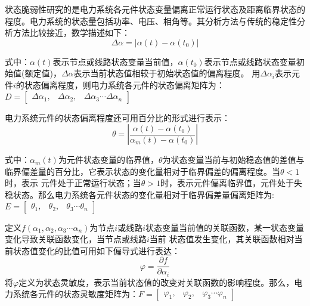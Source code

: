状态脆弱性研究的是电力系统各元件状态变量偏离正常运行状态及距离临界状态的程度。电力系统的状态量包括功率、电压、相角等。其分析方法与传统的稳定性分析方法比较接近，数学描述如下：
\begin{equation}
\Delta \alpha=\left|\alpha(t)-\alpha\left(t_{0}\right)\right|  
\end{equation}

式中：$\alpha(t)$表示节点或线路状态变量当前值，$\alpha\left(t_{0}\right)$表示节点或线路状态变量初始值(额定值)，$\Delta \alpha$表示当前状态值相较于初始状态值的偏离程度。
用$\Delta \alpha_i$表示元件$i$的状态偏离程度，则电力系统各元件的状态偏离矩阵为：$D=\left[\begin{array}{lll}{\Delta \alpha_{1},} & {\Delta \alpha_{2},} & {\Delta \alpha_{3} \cdots \Delta \alpha_{n}}\end{array}\right]$


电力系统元件的状态偏离程度还可用百分比的形式进行表示：
\begin{equation}
  \theta=\left|\frac{\alpha(t)-\alpha\left(t_{0}\right)}{\alpha_{m}(t)-\alpha\left(t_{0}\right)}\right|
  \end{equation}

式中：$\alpha_{m}(t)$为元件状态变量的临界值，$\theta$为状态变量当前与初始稳态值的差值与临界偏差量的百分比，它表示状态的变化量相对于临界偏差的偏离程度。当$\theta<1$时，表示
元件处于正常运行状态；当$\theta>1$时，表示元件偏离临界值，元件处于失稳状态。那么电力系统各元件状态的变化量相对于临界偏差量偏离矩阵为:$E=\left[\begin{array}{lll}{\theta_{1},} & {\theta_{2},} & {\theta_{3} \cdots \theta_{n}}\end{array}\right]$

定义$f\left(\alpha_{1}, \alpha_{2}, \alpha_{3} \cdots \alpha_{n}\right)$为节点$i$或线路$i$状态变量当前值的关联函数，某一状态变量变化导致关联函数变化，当节点或线路$i$当前
状态值发生变化，其关联函数相对当前状态值变化的比值可用如下偏导式进行表达：
\begin{equation}
  \varphi=\frac{\partial f}{\partial \alpha_{i}}
  \end{equation}
将$\varphi$定义为状态灵敏度，表示当前状态值的改变对关联函数的影响程度。那么，电力系统各元件的状态灵敏度矩阵为：$F=\left[\begin{array}{lll}{\varphi_{1},} & {\varphi_{2},} & {\varphi_{3} \cdots \varphi_{n}}\end{array}\right]$

